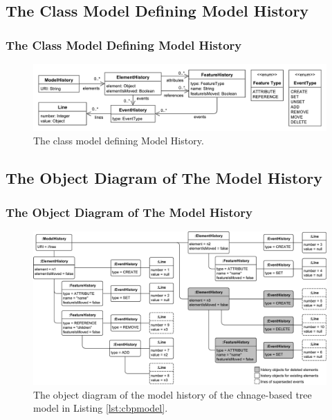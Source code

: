 \documentclass{beamer}
\begin{document}
\begin{frame}
\section{The Class Model Defining Model History}
\frametitle{The Class Model Defining Model History}
\begin{figure}[ht]
    \centering
    \includegraphics[width=\linewidth]{object_history}
    \caption{The class model defining Model History.}
    \label{fig:object_history}
\end{figure}
\end{frame}

\begin{frame}
\section{The Object Diagram of The Model History}
\frametitle{The Object Diagram of The Model History}
\begin{figure}[ht]
    \centering
    \includegraphics[width=\linewidth]{history_structure}
    \caption{The object diagram of the model history of the chnage-based tree model in Listing \ref{lst:cbpmodel}.}
    \label{fig:history_structure}
\end{figure}
\end{frame}
\end{document}
